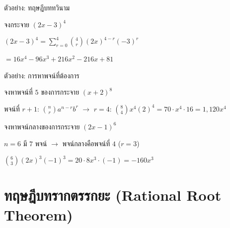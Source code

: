 \documentclass[11pt, aspectratio=169]{beamer}
\begin{document}
\begin{frame}{ตัวอย่าง: ทฤษฎีบททวินาม}
  \begin{exambox}[โจทย์ 1]
    จงกระจาย $(2x - 3)^4$
  \end{exambox}

  \begin{solbox}[วิธีทำ]
    $(2x-3)^4 = \sum_{r=0}^{4} \binom{4}{r} (2x)^{4-r} (-3)^r$

    $= 16x^4 - 96x^3 + 216x^2 - 216x + 81$
  \end{solbox}
\end{frame}

\begin{frame}{ตัวอย่าง: การหาพจน์ที่ต้องการ}
  \begin{exambox}[โจทย์]
    จงหาพจน์ที่ $5$ ของการกระจาย $(x + 2)^{8}$
  \end{exambox}

  \begin{solbox}[วิธีทำ]
    พจน์ที่ $r+1$: $\binom{n}{r}a^{n-r}b^r$ \quad $\rightarrow$ \quad
    $r = 4$: \;
    $\binom{8}{4}x^{4}(2)^4 = 70 \cdot x^4 \cdot 16 = 1{,}120x^4$
  \end{solbox}

  \begin{exambox}[โจทย์ 2]
    จงหาพจน์กลางของการกระจาย $(2x - 1)^6$
  \end{exambox}

  \begin{solbox}[วิธีทำ]
    $n=6$ มี $7$ พจน์ $\rightarrow$ พจน์กลางคือพจน์ที่ $4$ ($r = 3$)

    $\binom{6}{3}(2x)^{3}(-1)^3 = 20 \cdot 8x^3 \cdot (-1) = -160x^3$
  \end{solbox}
\end{frame}

\section{ทฤษฎีบทรากตรรกยะ (Rational Root Theorem)}
\end{document}
